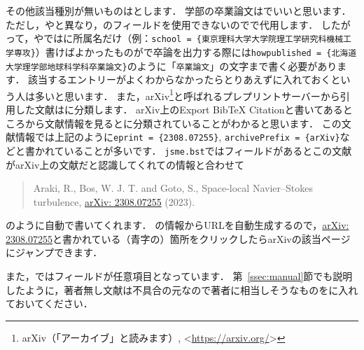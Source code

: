 \documentclass[a4paper,fleqn,uplatex,dvipdfmx]{jsarticle}
\newcommand{\jsmefile}{\texttt{jsme.bst}}
\begin{document}
その他該当種別が無いものは\ttmisc とします．
学部の卒業論文は\ttmisc でいいと思います．
ただし，\ttmastersthesis や\ttphdthesis と異なり，\ttschool のフィールドを使用できないので\tthowpublished で代用します．
したがって，\ttmastersthesis や\ttphdthesis では\ttschool に所属名だけ（例：\verb|school = {東京理科大学大学院理工学研究科機械工学専攻}|）書けばよかったものが\ttmisc で卒論を出力する際には\verb|howpublished = {北海道大学理学部地球科学科卒業論文}|のように「\verb|卒業論文|」の文字まで書く必要があります．
該当するエントリーがよくわからなかったらとりあえず\ttmisc に入れておくという人は多いと思います．
また，arXiv\footnote{arXiv（「アーカイブ」と読みます）, \textless\url{https://arxiv.org/}\textgreater}と呼ばれるプレプリントサーバーから引用した文献は\ttmisc に分類します．
arXiv上のExport BibTeX Citationと書いてあるところから文献情報を見ると\ttmisc に分類されていることがわかると思います．
この文献情報では上記のように\verb|eprint = {2308.07255}|, \verb|archivePrefix = {arXiv}|などと書かれていることが多いです．
\jsmefile では\ttarchivePrefix フィールドがあるとこの文献がarXiv上の文献だと認識してくれて\tteprint の情報と合わせて
\begin{quote}
    Araki, R., Bos, W. J. T. and Goto, S., Space-local Navier--Stokes turbulence, \href{https://doi.org/10.48550/arXiv.2308.07255}{arXiv: 2308.07255} (2023).
\end{quote}
のように自動で書いてくれます．
\tteprint の情報からURLを自動生成するので，\href{https://doi.org/10.48550/arXiv.2308.07255}{arXiv: 2308.07255}と書かれている（青字の）箇所をクリックしたらarXivの該当ページにジャンプできます．

また，\ttmisc では\ttauthor フィールドが任意項目となっています．
第~\ref{ssec:manual}節\ttmanual でも説明したように，著者無し文献は不具合の元なので著者に相当しそうなものを\ttauthor に入れておいてください．
\end{document}
